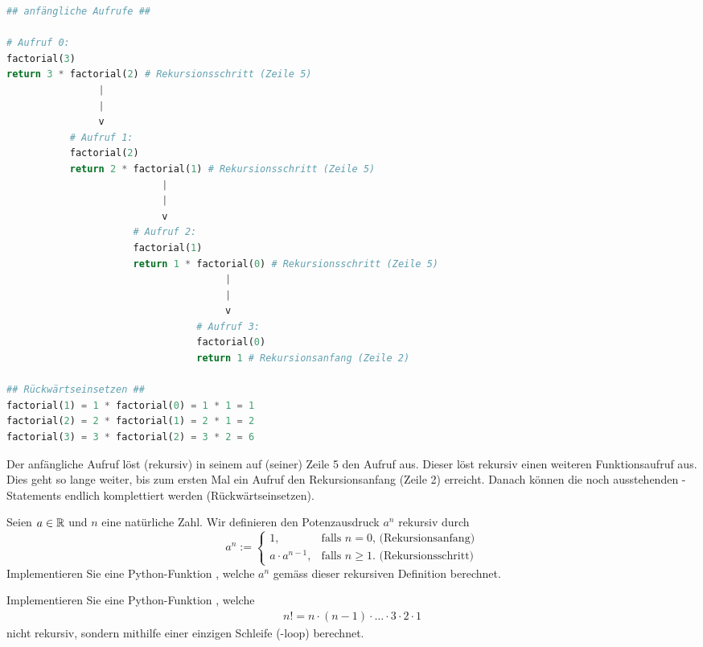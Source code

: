\lstset{basicstyle=\ttfamily\footnotesize}
\begin{lstlisting}[language=Python,caption=rekursive Berechnung der Fakultät,label=listing:lowtech]
## anfängliche Aufrufe ##

# Aufruf 0:
factorial(3)
return 3 * factorial(2) # Rekursionsschritt (Zeile 5)
                |
                |
                v 
           # Aufruf 1:
           factorial(2)
           return 2 * factorial(1) # Rekursionsschritt (Zeile 5)
                           |
                           |
                           v
                      # Aufruf 2:
                      factorial(1)
                      return 1 * factorial(0) # Rekursionsschritt (Zeile 5)
                                      |
                                      |
                                      v
                                 # Aufruf 3:
                                 factorial(0)
                                 return 1 # Rekursionsanfang (Zeile 2)

## Rückwärtseinsetzen ##
factorial(1) = 1 * factorial(0) = 1 * 1 = 1
factorial(2) = 2 * factorial(1) = 2 * 1 = 2
factorial(3) = 3 * factorial(2) = 3 * 2 = 6
\end{lstlisting}
Der anfängliche Aufruf  löst (rekursiv) in seinem  auf (seiner) Zeile 5 den Aufruf  aus. Dieser löst rekursiv einen weiteren Funktionsaufruf aus. Dies geht so lange weiter, bis zum ersten Mal ein Aufruf den Rekursionsanfang (Zeile 2) erreicht. Danach können die noch ausstehenden -Statements endlich komplettiert werden (Rückwärtseinsetzen).

\clearpage

\begin{myexercise}\label{myexercise:0303}
Seien $a\in\mathbb{R}$ und $n$ eine natürliche Zahl. Wir definieren den Potenzausdruck $a^n$ rekursiv durch
\[
  a^n := 
  \begin{cases}
    1, &\text{falls $n=0$, (Rekursionsanfang)} \\
    a\cdot a^{n-1}, & \text{falls  $n\geq 1$. (Rekursionsschritt)}
  \end{cases}
\]
Implementieren Sie eine Python-Funktion , welche $a^n$ gemäss dieser rekursiven Definition berechnet.
\end{myexercise}

\begin{myexercise}\label{myexercise:0302}
Implementieren Sie eine Python-Funktion , welche
\begin{align*}
    n! = n\cdot (n-1)\cdot\ldots\cdot 3\cdot 2\cdot 1
\end{align*}
nicht rekursiv, sondern mithilfe einer einzigen Schleife (-loop) berechnet.
\end{myexercise}

